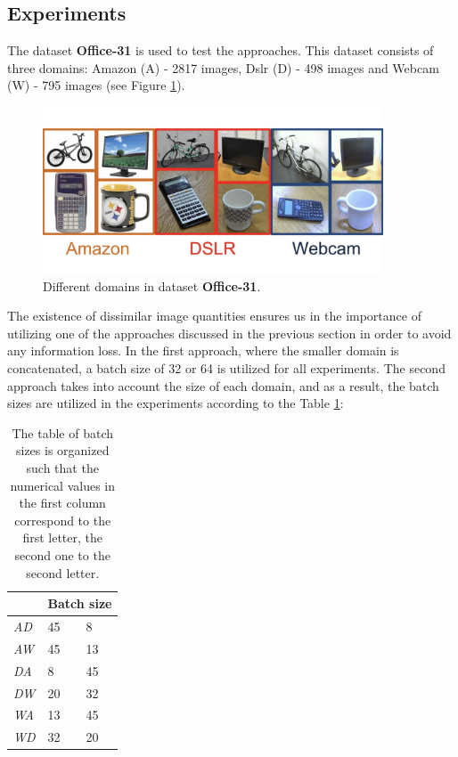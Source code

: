 \subsection{Experiments}

The dataset \textbf{Office-31} is used to test the approaches. This dataset consists of three domains: Amazon (A) - 2817 images, Dslr (D) - 498 images and Webcam (W) - 795 images (see Figure \ref{fig:office}). 

\begin{figure}[H]
    \centering
    \includegraphics[width=0.9\textwidth]{Figures/Results/office-31.jpg}
    \caption{Different domains in dataset \textbf{Office-31}.}
    \label{fig:office}
\end{figure}

The existence of dissimilar image quantities ensures us in the importance of utilizing one of the approaches discussed in the previous section in order to avoid any information loss. In the first approach, where the smaller domain is concatenated, a batch size of 32 or 64 is utilized for all experiments. The second approach takes into account the size of each domain, and as a result, the batch sizes are utilized in the experiments according to the Table \ref{tab:batchsizes}:

\begin{table}[h]
\centering
\caption{The table of batch sizes is organized such that the numerical values in the first column correspond to the first letter, the second one to the second letter.}
\label{tab:batchsizes}
\begin{tabular}{|p{1.5cm}|p{1.5cm}|p{1.5cm}|}
\hline
   & \multicolumn{2}{l|}{Batch size} \\ \hline
\textit{AD} & 45   & 8   \\ \hline
\textit{AW} & 45   & 13  \\ \hline
\textit{DA} & 8    & 45  \\ \hline
\textit{DW} & 20   & 32  \\ \hline
\textit{WA} & 13   & 45  \\ \hline
\textit{WD} & 32   & 20  \\ \hline
\end{tabular}
\end{table}

